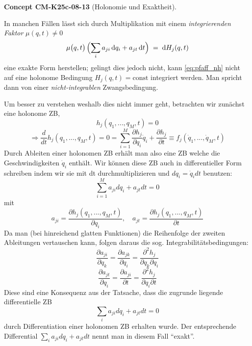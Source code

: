 \documentclass[10pt, letterpaper]{article}
\newcommand{\CustomHeading}[3]{%
  \par\medskip\noindent%
  \textbf{#1 #2} \textnormal{(#3)}.\enskip%
}
\newenvironment{CONC}[2]{\begin{unitbox}\CustomHeading{Concept}{#1}{#2}}{\end{unitbox}}
\begin{document}
\begin{CONC}{CM-K25c-08-13}{Holonomie und Exaktheit}
In manchen Fällen lässt sich durch Multiplikation mit einem
\emph{integrierenden Faktor} $\mu(q,t)\neq 0$
\[
  \mu\bigl(q,t\bigr)\,
  \Bigl(\sum_{i} a_{ji}\,\mathrm dq_i + a_{jt}\,\mathrm dt\Bigr)
  \;=\;
  \mathrm d H_j(q,t)
\]
eine exakte Form herstellen; gelingt dies jedoch nicht, kann
\eqref{eq:pfaff_nh} nicht auf eine holonome Bedingung
$H_j(q,t)=\text{const}$ integriert werden. Man spricht dann von einer
\emph{nicht-integrablen} Zwangsbedingung.
\end{CONC}





Um besser zu verstehen weshalb dies nicht immer geht, betrachten wir zunächst eine holonome ZB,
\[h_j(q_1,...,q_M,t) = 0\]
\[\Rightarrow \frac{d}{dt}h_j(q_1,...,q_M,t) = 0 = \sum_{i=1}^M \frac{\partial h_j}{\partial q_i}\dot{q}_i + \frac{\partial h_j}{\partial t} \equiv f_j(\dot{q}_1,...,\dot{q}_M,t)\]
Durch Ableiten einer holonomen ZB erhält man also eine ZB welche die Geschwindigkeiten $\dot{q}_i$ enthält. Wir können diese ZB auch in differentieller Form schreiben indem wir sie mit dt durchmultiplizieren und $dq_i = \dot{q}_i dt$ benutzen:
\begin{equation*}
\sum_{i=1}^M a_{ji}dq_i + a_{jt}dt = 0
\end{equation*}
mit \[a_{ji} = \frac{\partial h_j(q_1,...,q_M,t)}{\partial q_i}, \quad a_{jt} = \frac{\partial h_j(q_1,...,q_M,t)}{\partial t}\]
Da man (bei hinreichend glatten Funktionen) die Reihenfolge der zweiten Ableitungen vertauschen kann, folgen daraus die sog. Integrabilitätsbedingungen:
\begin{equation*}
\frac{\partial a_{ji}}{\partial q_k} = \frac{\partial a_{jk}}{\partial q_i} = \frac{\partial^2 h_j}{\partial q_k \partial q_i}
\end{equation*}
\begin{equation*}
\frac{\partial a_{jt}}{\partial q_i} = \frac{\partial a_{ji}}{\partial t} = \frac{\partial^2 h_j}{\partial q_i \partial t}
\end{equation*}
Diese sind eine Konsequenz aus der Tatsache, dass die zugrunde liegende differentielle ZB
\[\sum_i a_{ji}dq_i + a_{jt}dt = 0\]
durch Differentiation einer holonomen ZB erhalten wurde. Der entsprechende Differential $\sum_i a_{ji} dq_i + a_{jt} dt$ nennt man in diesem Fall ``exakt''.
\end{document}
